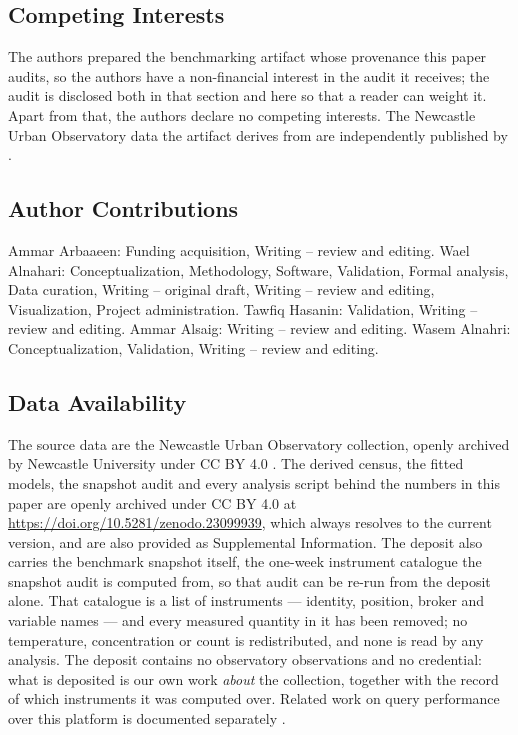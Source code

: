 \documentclass[fleqn,10pt,lineno]{wlpeerj}
\begin{document}
\subsection*{Competing Interests}
\noindent The authors prepared the benchmarking artifact whose provenance this
paper audits, so the authors have a non-financial interest in the audit it receives; the audit
is disclosed both in that section and here so that a reader can weight it. Apart from that, the
authors declare no competing interests. The Newcastle Urban Observatory data the artifact
derives from are independently published by \citet{uo_archive}.

\subsection*{Author Contributions}
\noindent \noindent Ammar Arbaaeen: Funding acquisition, Writing -- review and editing. Wael Alnahari: Conceptualization, Methodology, Software, Validation, Formal analysis, Data curation, Writing -- original draft, Writing -- review and editing, Visualization, Project administration. Tawfiq Hasanin: Validation, Writing -- review and editing. Ammar Alsaig: Writing -- review and editing. Wasem Alnahri: Conceptualization, Validation, Writing -- review and editing.

\subsection*{Data Availability}
\noindent The source data are the Newcastle Urban Observatory collection, openly
archived by Newcastle University under CC BY 4.0 \citep{uo_archive}. The derived census,
the fitted models, the snapshot audit and every analysis script behind the numbers in this
paper are openly archived under CC BY 4.0 at
\url{https://doi.org/10.5281/zenodo.23099939}, which always resolves to the current version,
and are also provided as Supplemental Information. The deposit also carries the benchmark
snapshot itself, the one-week instrument catalogue the snapshot audit is computed from, so
that audit can be re-run from the deposit alone. That catalogue is a list of instruments ---
identity, position, broker and variable names --- and every measured quantity in it has been
removed; no temperature, concentration or count is redistributed, and none is read by any
analysis. The deposit contains no observatory observations and no credential: what is
deposited is our own work \emph{about} the collection, together with the record of which
instruments it was computed over. Related work on query
performance over this platform is documented separately \citep{alnahari2026complexity}.
\end{document}
